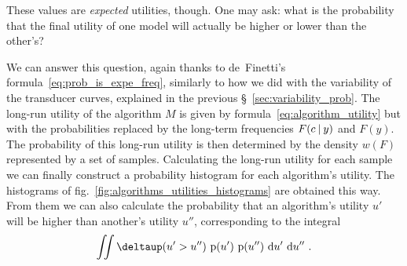 \documentclass[\ifafour a4paper,12pt,\else a5paper,10pt,\fi%
onecolumn,oneside,article,%
british%
]{memoir}
\makeatletter
\newcommand*{\widefbox}[1]{\fbox{\hspace{1em}#1\hspace{1em}}}
\theoremstyle{remark}
\theoremstyle{innote}
\def\sum{\DOTSI\sumop\slimits@}
\newcommand*{\de}{\partialup}%
\newcommand*{\delt}{\deltaup}%
\newcommand*{\di}{\mathrm{d}}%
\newcommand*{\p}{\mathrm{p}}%
\renewcommand*{\|}[1][]{\nonscript\:#1\vert\nonscript\:\mathopen{}}
\newcommand*{\sect}{\S}%
\newcommand*{\fig}{fig.}%
\newcommand*{\tsum}{\mathop{\textstyle\sum}\nolimits}
\newcommand*{\wf}{w}
\makeatother
\begin{document}
These values are \emph{expected} utilities, though. One may ask: what is the probability that the final utility of one model will actually be higher or lower than the other's?

We can answer this question, again thanks to de~Finetti's formula~\eqref{eq:prob_is_expe_freq}, similarly to how we did with the variability of the transducer curves, explained in the previous \sect~\ref{sec:variability_prob}. The long-run utility of the algorithm $M$ is given by formula~\eqref{eq:algorithm_utility} but with the probabilities replaced by the long-term frequencies $F(c\|y)$ and $F(y)$. The probability of this long-run utility is then determined by the density $\wf(F)$ represented by a set of samples. Calculating the long-run utility for each sample we can finally construct a probability histogram for each algorithm's utility. The histograms of \fig~\ref{fig:algorithms_utilities_histograms} are obtained this way. From them we can also calculate the probability that an algorithm's utility $u'$ will be higher than another's utility $u''$, corresponding to the integral
\begin{equation}
  \label{eq:compare_alg_utilities}
\iint \delt(u' > u'')\ \p(u')\ \p(u'')\ \di u'\ \di u'' \ .
\end{equation}



\end{document}
